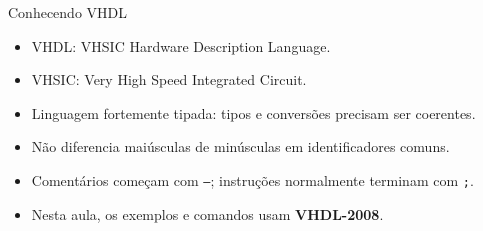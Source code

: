 \begin{frame}[t]{Conhecendo VHDL}
\begin{itemize}
\item VHDL: VHSIC Hardware Description Language.
\item VHSIC: Very High Speed Integrated Circuit.
\item Linguagem fortemente tipada: tipos e conversões precisam ser coerentes.
\item Não diferencia maiúsculas de minúsculas em identificadores comuns.
\item Comentários começam com \texttt{--}; instruções normalmente terminam com \texttt{;}.
\item Nesta aula, os exemplos e comandos usam \textbf{VHDL-2008}.
\end{itemize}
\end{frame}
